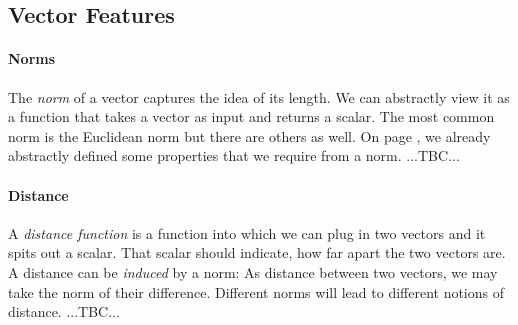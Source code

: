 %

\subsection{Vector Features}

\paragraph{Norms}
The \emph{norm} of a vector captures the idea of its length. We can abstractly view it as a function that takes a vector as input and returns a scalar. The most common norm is the Euclidean norm but there are others as well. On page \pageref{Tab:Norm}, we already abstractly defined some properties that we require from a norm. ...TBC...

\paragraph{Distance}
A \emph{distance function} is a function into which we can plug in two vectors and it spits out a scalar. That scalar should indicate, how far apart the two vectors are. A distance can be \emph{induced} by a norm: As distance between two vectors, we may take the norm of their difference. Different norms will lead to different notions of distance. ...TBC...




